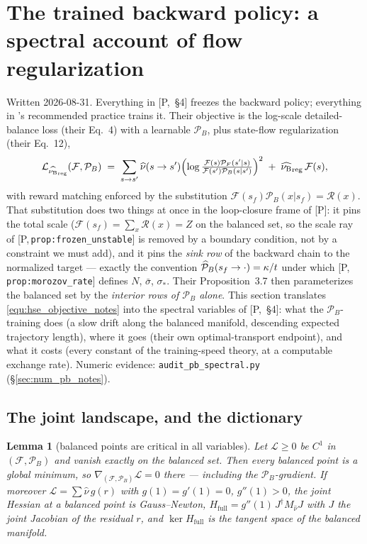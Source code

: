 \documentclass[11pt]{article}
\newtheorem{lemma}[theorem]{Lemma}
\theoremstyle{definition}
\theoremstyle{remark}
\newcommand{\paperref}[1]{[P,\,\texttt{#1}]}   %
\begin{document}
\section{The trained backward policy: a spectral account of flow
regularization}\label{sec:pbtrain_notes}

Written 2026-08-31. Everything in [P,~\S4] freezes the backward policy; everything in
\citet{morozov2025revisiting}'s recommended practice trains it. Their objective is the
log-scale detailed-balance loss (their Eq.~4) with a learnable $\mathcal P_B$, plus state-flow
regularization (their Eq.~12),
\begin{equation}\label{equ:hse_objective_notes}
    \mathcal L_{\lamreg}(\mathcal F, \mathcal P_B)
    \;=\; \sum_{s\to s'} \widehat\nu(s\to s')
    \Bigl(\log\tfrac{\mathcal F(s)\mathcal P_F(s'|s)}{\mathcal F(s')\mathcal P_B(s|s')}\Bigr)^2
    \;+\; \lamreg\,\mathcal F(s),
\end{equation}
with reward matching enforced by the substitution
$\mathcal F(s_f)\mathcal P_B(x|s_f)=\mathcal R(x)$. That substitution does two things at
once in the loop-closure frame of [P]: it pins the total scale ($\mathcal F(s_f) =
\sum_x\mathcal R(x) = Z$ on the balanced set, so the scale ray of
\paperref{prop:frozen\_unstable} is removed by a boundary condition, not by a constraint we
must add), and it pins the \emph{sink row} of the backward chain to the normalized target
--- exactly the convention $\widehat{\mathcal P}_B(s_f\to\cdot)=\kappa/t$ under which
\paperref{prop:morozov\_rate} defines $N$, $\bar\sigma$, $\sigma_*$. Their Proposition~3.7
then parameterizes the balanced set by the \emph{interior rows of $\mathcal P_B$ alone}.
This section translates \eqref{equ:hse_objective_notes} into the spectral variables of
[P,~\S4]: what the $\mathcal P_B$-training does (a slow drift along the balanced manifold,
descending expected trajectory length), where it goes (their own optimal-transport
endpoint), and what it costs (every constant of the training-speed theory, at a computable
exchange rate). Numeric evidence: \texttt{audit\_pb\_spectral.py}
(\S\ref{sec:num_pb_notes}).

\subsection{The joint landscape, and the dictionary}\label{sec:joint_notes}

\begin{lemma}[balanced points are critical in all variables]\label{lem:balanced_min_notes}
Let $\mathcal L\geq0$ be $C^1$ in $(\mathcal F,\mathcal P_B)$ and vanish exactly on the
balanced set. Then every balanced point is a global minimum, so
$\nabla_{(\mathcal F,\mathcal P_B)}\mathcal L=0$ there --- including the
$\mathcal P_B$-gradient. If moreover $\mathcal L=\sum\widehat\nu\, g(r)$ with
$g(1)=g'(1)=0$, $g''(1)>0$, the joint Hessian at a balanced point is Gauss--Newton,
$H_{\mathrm{full}} = g''(1)\, J^\dagger M_{\widehat\nu} J$ with $J$ the joint Jacobian of
the residual $r$, and $\ker H_{\mathrm{full}}$ is the tangent space of the balanced
manifold.
\end{lemma}
\end{document}
